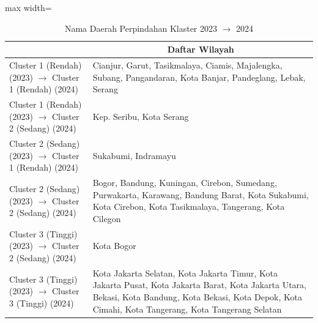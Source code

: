 \begin{table}[H]
\centering
\caption{Nama Daerah Perpindahan Klaster 2023 \(\rightarrow\) 2024} \label{tab:app2transname2023x2024}
\begin{adjustbox}{max width=\textwidth}
\begin{tabular}{|>{\centering\arraybackslash}p{4cm}|p{10cm}|}
\hline
\multicolumn{1}{|c|}{\textbf{Kategori}} & \multicolumn{1}{c|}{\textbf{Daftar Wilayah}} \\
\hline
Cluster 1 (Rendah) (2023) \(\rightarrow\) Cluster 1 (Rendah) (2024) & Cianjur, Garut, Tasikmalaya, Ciamis, Majalengka, Subang, Pangandaran, Kota Banjar, Pandeglang, Lebak, Serang \\
\hline
Cluster 1 (Rendah) (2023) \(\rightarrow\) Cluster 2 (Sedang) (2024) & Kep. Seribu, Kota Serang \\
\hline
Cluster 2 (Sedang) (2023) \(\rightarrow\) Cluster 1 (Rendah) (2024) & Sukabumi, Indramayu \\
\hline
Cluster 2 (Sedang) (2023) \(\rightarrow\) Cluster 2 (Sedang) (2024) & Bogor, Bandung, Kuningan, Cirebon, Sumedang, Purwakarta, Karawang, Bandung Barat, Kota Sukabumi, Kota Cirebon, Kota Tasikmalaya, Tangerang, Kota Cilegon \\
\hline
Cluster 3 (Tinggi) (2023) \(\rightarrow\) Cluster 2 (Sedang) (2024) & Kota Bogor \\
\hline
Cluster 3 (Tinggi) (2023) \(\rightarrow\) Cluster 3 (Tinggi) (2024) & Kota Jakarta Selatan, Kota Jakarta Timur, Kota Jakarta Pusat, Kota Jakarta Barat, Kota Jakarta Utara, Bekasi, Kota Bandung, Kota Bekasi, Kota Depok, Kota Cimahi, Kota Tangerang, Kota Tangerang Selatan \\
\hline
\end{tabular}
\end{adjustbox}
\end{table}